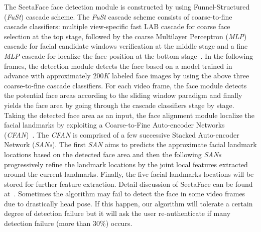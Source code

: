             The SeetaFace face detection module is constructed by using Funnel-Structured (\emph{FuSt}) cascade scheme. The \emph{FuSt} cascade scheme consists of coarse-to-fine cascade classifiers: multiple view-specific fast LAB  cascade for coarse face selection at the top stage, followed by the coarse Multilayer Perceptron (\emph{MLP}) cascade for facial candidate windows verification at the middle stage and a fine \emph{MLP} cascade for localize the face position at the bottom stage~\cite{Wu2016Funnel}. In the following frames, the detection module detects the face based on a model trained in advance with approximately $200K$ labeled face images by using the above three coarse-to-fine cascade classifiers. For each video frame, the face module detects the potential face areas according to the sliding window paradigm and finally yields the face area by going through the cascade classifiers stage by stage. Taking the detected face area as an input, the face alignment module localize the facial landmarks by exploiting a Coarse-to-Fine Auto-encoder Networks (\emph{CFAN})~\cite{Zhang2014Coarse}. The \emph{CFAN} is comprised of a few successive Stacked Auto-encoder Network (\emph{SANs}). The first \emph{SAN} aims to predicts the approximate facial landmark locations based on the detected face area and then the following \emph{SANs} progressively refine the landmark locations by the joint local features extracted around the current landmarks. Finally, the five facial landmarks locations will be stored for further feature extraction. Detail discussion of SeetaFace can be found at~\cite{SeetaFace-toolbox-web}. Sometimes the algorithm may fail to detect the face in some video frames due to drastically head pose. If this happen, our algorithm will tolerate a certain degree of detection failure but it will ask the user re-authenticate if many detection failure (more than 30\%) occurs.

